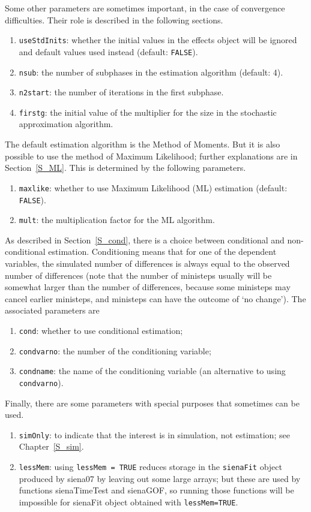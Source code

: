 \documentclass[a4paper,fleqn,11pt]{article}
\newcommand{\+}{\, + \,}
\newcommand{\sfn}[1]{\textsf{#1}}
\begin{document}
Some other parameters are sometimes important, in the case of convergence
difficulties.  Their role is described in the following sections.
\begin{enumerate}[resume]
  \item \texttt{useStdInits}: whether the initial values in the effects
    object will be ignored and default values used instead (default: \texttt{FALSE}).
  \item \texttt{nsub}:  the number of subphases in the estimation algorithm
    (default: 4).
  \item \texttt{n2start}: the number of iterations in the first subphase.
  \item \texttt{firstg}: the initial value of the multiplier for the size in the
       stochastic approximation algorithm.
\end{enumerate}
The default estimation algorithm is the Method of Moments. But it is also possible
to use the method of Maximum Likelihood; further explanations are in Section~\ref{S_ML}.
This is determined by the following parameters.
\begin{enumerate}[resume]
  \item \texttt{maxlike}: whether to use Maximum Likelihood (ML) estimation
       (default: \texttt{FALSE}).
  \item \texttt{mult}: the multiplication factor for the ML algorithm.
\end{enumerate}
As described in Section~\ref{S_cond}, there is a choice between conditional
and non-conditional estimation. Conditioning means that for one of the
dependent variables, the simulated number of differences is always equal to
the observed number of differences (note that the number of ministeps usually will
be somewhat larger than the number of differences, because some ministeps
may cancel earlier ministeps, and ministeps can have the outcome of
`no change'). The associated parameters are
\begin{enumerate}[resume]
  \item \texttt{cond}: whether to use conditional estimation;
  \item \texttt{condvarno}: the number of the conditioning variable;
  \item \texttt{condname}: the name of the conditioning variable (an alternative
      to using \texttt{condvarno}).
\end{enumerate}
Finally, there are some parameters with special purposes that sometimes
can be used.
\begin{enumerate}[resume]
  \item \texttt{simOnly}: to indicate that the interest is in simulation,
       not estimation; see Chapter~\ref{S_sim}.
  \item \texttt{lessMem}: using \texttt{lessMem~=~TRUE} reduces storage in
      the \texttt{sienaFit} object produced by \sfn{siena07} by leaving out
      some large arrays; but these are used by functions
     \sfn{sienaTimeTest} and \sfn{sienaGOF}, so running those functions will be impossible
     for \sfn{sienaFit} object obtained with \texttt{lessMem=TRUE}.
\end{enumerate}
\end{document}
